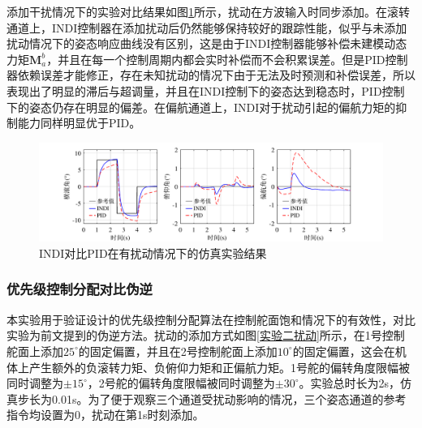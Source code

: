 添加干扰情况下的实验对比结果如图\ref{INDI对比PID仿真有扰动}所示，扰动在方波输入时同步添加。在滚转通道上，INDI控制器在添加扰动后仍然能够保持较好的跟踪性能，似乎与未添加扰动情况下的姿态响应曲线没有区别，这是由于INDI控制器能够补偿未建模动态力矩$\boldsymbol{M}_a^b$，并且在每一个控制周期内都会实时补偿而不会积累误差。但是PID控制器依赖误差才能修正，存在未知扰动的情况下由于无法及时预测和补偿误差，所以表现出了明显的滞后与超调量，并且在INDI控制下的姿态达到稳态时，PID控制下的姿态仍存在明显的偏差。在偏航通道上，INDI对于扰动引起的偏航力矩的抑制能力同样明显优于PID。
\begin{figure}[htbp]
	\centering
	\begin{minipage}[c]{1\textwidth}
        \centering
        \includegraphics[scale=1]{Fig/INDI对比PID有扰动仿真实验结果.pdf}
        \caption{\label{INDI对比PID仿真有扰动}INDI对比PID在有扰动情况下的仿真实验结果}
        \end{minipage}
\end{figure}

\subsubsection{优先级控制分配对比伪逆}

本实验用于验证设计的优先级控制分配算法在控制舵面饱和情况下的有效性，对比实验为前文提到的伪逆方法。扰动的添加方式如图\ref{实验二扰动}所示，在1号控制舵面上添加$25^{\circ}$的固定偏置，并且在2号控制舵面上添加$10^{\circ}$的固定偏置，这会在机体上产生额外的负滚转力矩、负俯仰力矩和正偏航力矩。1号舵的偏转角度限幅被同时调整为$\pm15^{\circ}$，2号舵的偏转角度限幅被同时调整为$\pm30^{\circ}$。实验总时长为2s，仿真步长为0.01s。为了便于观察三个通道受扰动影响的情况，三个姿态通道的参考指令均设置为0，扰动在第1s时刻添加。

